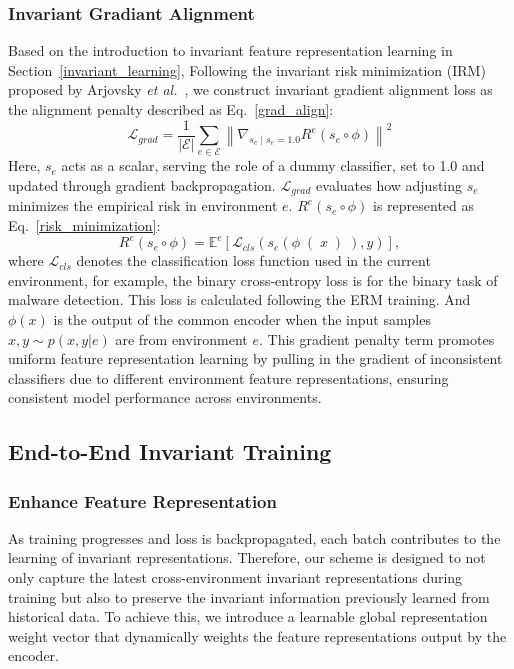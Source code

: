 \subsubsection{Invariant Gradiant Alignment}
\label{gradient_alignment}
Based on the introduction to invariant feature representation learning in Section~\ref{invariant_learning}, Following the invariant risk minimization (IRM) proposed by Arjovsky \textit{et al.}~\cite{IRM_training}, we construct invariant gradient alignment loss as the alignment penalty described as Eq.~\ref{grad_align}:
\begin{equation}
\label{grad_align}
\mathcal{L}_{grad} = \frac{1}{|\mathcal{E}|} \sum_{e \in \mathcal{E}} \left\|\nabla_{s_{e} \mid s_{e}=1.0} R^{e}(s_e \circ \phi)\right\|^2
\end{equation}
Here, $s_{e}$ acts as a scalar, serving the role of a dummy classifier, set to 1.0 and updated through gradient backpropagation. $\mathcal{L}_{grad}$ evaluates how adjusting $s_e$ minimizes the empirical risk in environment $e$. $R^e(s_e \circ \phi)$ is represented as Eq.~\ref{risk_minimization}:
\begin{equation}
\label{risk_minimization}
R^{e}(s_{e} \circ \phi)=\mathbb{E}^{e}\left[\mathcal{L}_{cls} \left(s_{e}\left(\phi\right(x\left)\right), y\right)\right],
\end{equation}
where $\mathcal{L}_{cls}$ denotes the classification loss function used in the current environment, for example, the binary cross-entropy loss is for the binary task of malware detection. This loss is calculated following the ERM training. And $\phi(x)$ is the output of the common encoder when the input samples $x, y \sim p(x, y|e)$ are from environment $e$. This gradient penalty term promotes uniform feature representation learning by pulling in the gradient of inconsistent classifiers due to different environment feature representations, ensuring consistent model performance across environments.

\subsection{End-to-End Invariant Training}
\label{invariant training}


\subsubsection{Enhance Feature Representation}
As training progresses and loss is backpropagated, each batch contributes to the learning of invariant representations. Therefore, our scheme is designed to not only capture the latest cross-environment invariant representations during training but also to preserve the invariant information previously learned from historical data. To achieve this, we introduce a learnable global representation weight vector that dynamically weights the feature representations output by the encoder.

